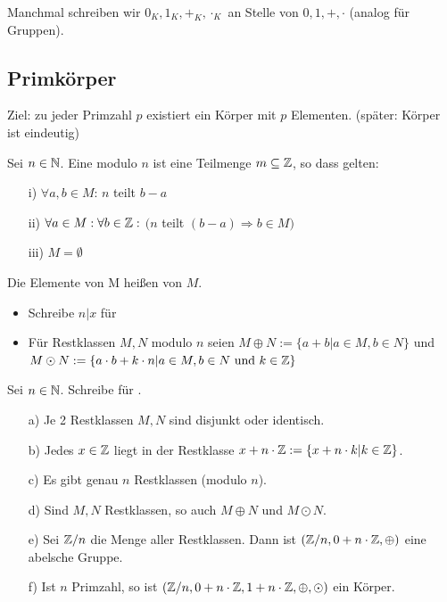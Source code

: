\begin{nota}
	Manchmal schreiben wir $0_{K},1_{K},+_{K},\cdot_{K}$ an Stelle von $0,1,+,\cdot$ (analog für Gruppen).
\end{nota}

\subsection{Primkörper}

Ziel: zu jeder Primzahl $p$ existiert ein Körper mit $p$ Elementen. (später: Körper ist eindeutig)
\begin{defi}
	Sei $n\in\mathbb{N}$. Eine  modulo $n$ ist eine Teilmenge $m\subseteq\mathbb{Z}$, so dass gelten:
	\begin{itemize}
		\item[i)] $\forall a,b\in M$: $n$ teilt $b-a$
		\item[ii)] $\forall a\in M:\forall b\in\mathbb{Z}:$ $(n$ teilt $(b-a)\Rightarrow b\in M)$
		\item[iii)]  $M=\emptyset$
	\end{itemize}
	Die Elemente von M heißen  von $M$.
\end{defi}

\begin{nota}
	\begin{itemize}
		\item[]
		\item Schreibe $n|x$ für 
		\item Für Restklassen $M,N$ modulo $n$ seien $M\oplus N:=\{a+b|a\in M,b\in N\}$ und $M\odot N:=\{a\cdot b+k\cdot n|a\in M,b\in N\text{ und }k\in\mathbb{Z}\}$\
	\end{itemize}
\end{nota}

\begin{satz}
	Sei $n\in\mathbb{N}$. Schreibe  für .
	\begin{itemize}
		\item[a)] Je 2 Restklassen $M,N$ sind disjunkt oder identisch.
		\item[b)] Jedes $x\in\mathbb{Z}$ liegt in der Restklasse $x+n\cdot\mathbb{Z}:=\{x+n\cdot k|k\in\mathbb{Z}\}$.
		\item[c)] Es gibt genau $n$ Restklassen (modulo $n$).
		\item[d)] Sind $M,N$ Restklassen, so auch $M\oplus N$ und $M\odot N$.
		\item[e)] Sei $\mathbb{Z}/n$ die Menge aller Restklassen. Dann ist $(\mathbb{Z}/n,0+n\cdot\mathbb{Z},\oplus)$ eine abelsche Gruppe.
		\item[f)] Ist $n$ Primzahl, so ist $(\mathbb{Z}/n,0+n\cdot\mathbb{Z},1+n\cdot\mathbb{Z},\oplus,\odot)$ ein Körper.
	\end{itemize}
\end{satz}

